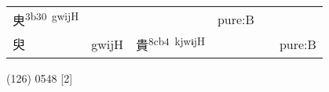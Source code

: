 \documentclass[14pt,a4paper]{scrartcl}
\begin{document}
\begin{longtable}[c]{@{}llllll@{}}
\begin{minipage}[t]{0.14\columnwidth}
㬰\textsuperscript{3b30~gwijH}
\strut\end{minipage} &
\begin{minipage}[t]{0.14\columnwidth}\raggedright\strut
\strut\end{minipage} &
\begin{minipage}[t]{0.14\columnwidth}\raggedright\strut
\strut\end{minipage} &
\begin{minipage}[t]{0.14\columnwidth}\raggedright\strut
pure:B
\strut\end{minipage}\tabularnewline
\begin{minipage}[t]{0.14\columnwidth}\raggedright\strut
臾
\strut\end{minipage} &
\begin{minipage}[t]{0.14\columnwidth}\raggedright\strut
gwijH
\strut\end{minipage} &
\begin{minipage}[t]{0.14\columnwidth}\raggedright\strut
貴\textsuperscript{8cb4~kjwɨjH}
\strut\end{minipage} &
\begin{minipage}[t]{0.14\columnwidth}\raggedright\strut
\strut\end{minipage} &
\begin{minipage}[t]{0.14\columnwidth}\raggedright\strut
\strut\end{minipage} &
\begin{minipage}[t]{0.14\columnwidth}\raggedright\strut
pure:B
\strut\end{minipage}\tabularnewline
\bottomrule
\end{longtable}

(126) 0548 {[}2{]}
\end{document}
